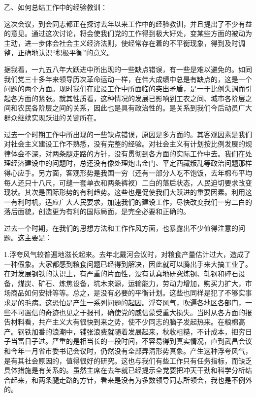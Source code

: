 \begin{maonote}
乙、如何总结工作中的经验教训：

这次会议，到会同志都正在探讨去年以来工作中的经验教训，并且提出了不少有益的意见。通过这次讨论，将会使我们党的工作得到极大好处，变某些方面的被动为主动，进一步体会社会主义经济法则，使经常存在着的不平衡现象，得到及时调整，正确地认识“积极平衡”的意义。

据我看，一九五八年大跃进中所出现的一些缺点错误，有一些是难以避免的。如同我们党三十多年来领导历次革命运动一样，在伟大成绩中总是有缺点的，这是一个问题的两个方面。现时我们在建设工作中所面临的突出矛盾，是一于比例失调而引起各方面的紧张。就其性质看，这种情况的发展已影响到工农之间、城市各阶层之间和农民各阶层之间的关系，因此也是具有政治性的。是关系到我们今后动员广大群众继续实现跃进的关键所在。

过去一个时期工作中所出现的一些缺点错误，原因是多方面的。其客观因素是我们对社会主义建设工作不熟悉，没有完整的经验。对社会主义有计划按比例发展的规律体会不深，对两条腿走路的方针，没有贯彻到各方面的实际工作中去。我们在处理经济建设中的问题时，总还没有像处理炮击金门、平定西藏叛乱等政治问题那样得心应手。另方面，客观形势是我国一穷（还有一部分人吃不饱饭，去年棉布平均每人还只十八尺，可缝一套单衣和两条裤衩）二白的落后状态，人民迫切要求改变现状。其次是国际形势的有利趋势。这些也是促使我们大跃进的重要因素。利用这一有利时机，适应广大人民要求，加速我们的建设工作，尽快改变我们一穷二白的落后面貌，创造更为有利的国际局面，是完全必要和正确的。

过去一个时期，在我们的思想方法和工作作风方面，也暴露出不少值得注意的问题。这主要是：

1.浮夸风气较普遍地滋长起来。去年北戴河会议时，对粮食产量估计过大，造成了一种假象。大家都感到粮食问题已经得到解决，因此就可以腾出手来大搞工业了。在对发展钢铁的认识上，有严重的片面性，没有认真地研究炼钢、轧钢和碎石设备，煤炭、矿石、炼焦设备，坑木来源，运输能力，劳动力增加，购买力扩大，市场商品如何安排等等。总之，是没有必要的平衡计划。这些也同样是犯了不够实事求是的毛病。这恐怕是产生一系列问题的起因。浮夸风气，吹遍各地区各部门，一些不可置信的奇迹也见之于报刊，确使党的威信蒙受重大损失。当时从各方面的报告材料看，共产主义大有很快到来之势，使不少同志的脑子发起热来。在粮棉高产。钢铁加番的浪潮中，铺张浪费就随着发展起来，秋收粗糙，不计成本，把穷日子当富日子过。严重的是相当长的一段时间，不容易得到真实情况，直到武昌会议和今年一月省市委书记会议时，仍然没有全部弄清形势真象。产生这种浮夸风气，是有其社会原因的，值得很好的研究。这也与我们有些工作只有任务指标，而缺乏具体措施是有关系的。虽然主席在去年就已经提示全党要把冲天干劲和科学分析结合起来，和两条腿走路的方针，看来是没有为多数领导同志所领会，我也是不例外的。


\end{maonote}
